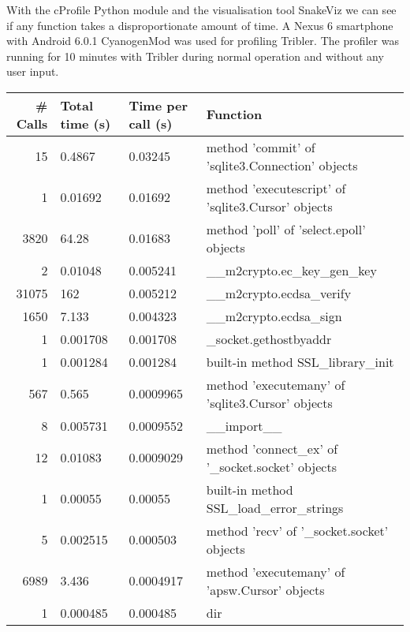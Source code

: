 With the cProfile Python module and the visualisation tool SnakeViz we can see if any function takes a disproportionate amount of time.
A Nexus 6 smartphone with Android 6.0.1 CyanogenMod was used for profiling Tribler.
The profiler was running for 10 minutes with Tribler during normal operation and without any user input.
\begin{table}
	\begin{tabular}{r | l | l | l} \hline
		\# Calls & Total time (s) & Time per call (s) & Function \\ \hline \hline
		15 & 0.4867 & 0.03245 & method 'commit' of 'sqlite3.Connection' objects \\ \hline
		1 & 0.01692 & 0.01692 & method 'executescript' of 'sqlite3.Cursor' objects \\ \hline
		3820 & 64.28 & 0.01683 & method 'poll' of 'select.epoll' objects \\ \hline
		2 & 0.01048 & 0.005241 & \_\_m2crypto.ec\_key\_gen\_key \\ \hline
		31075 & 162 & 0.005212 & \_\_m2crypto.ecdsa\_verify \\ \hline
		1650 & 7.133 & 0.004323 & \_\_m2crypto.ecdsa\_sign \\ \hline
		1 & 0.001708 & 0.001708 & \_socket.gethostbyaddr \\ \hline
		1 & 0.001284 & 0.001284 & built-in method SSL\_library\_init \\ \hline
		567 & 0.565 & 0.0009965 & method 'executemany' of 'sqlite3.Cursor' objects \\ \hline
		8 & 0.005731 & 0.0009552 & \_\_import\_\_ \\ \hline
		12 & 0.01083 & 0.0009029 & method 'connect\_ex' of '\_socket.socket' objects \\ \hline
		1 & 0.00055 & 0.00055 & built-in method SSL\_load\_error\_strings \\ \hline
		5 & 0.002515 & 0.000503 & method 'recv' of '\_socket.socket' objects \\ \hline
		6989 & 3.436 & 0.0004917 & method 'executemany' of 'apsw.Cursor' objects \\ \hline
		1 & 0.000485 & 0.000485 & dir \\ \hline

\end{tabular}
\end{table}
